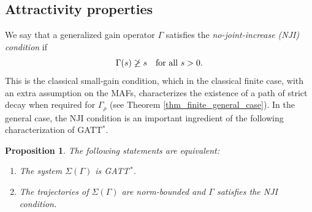 \documentclass[10pt, oneside, a4paper]{article}
\newtheorem{proposition}{Proposition}[section]
\begin{document}
\subsection{Attractivity properties}\label{subsec_stability}

We say that a generalized gain operator $\Gamma$ satisfies the \emph{no-joint-increase (NJI) condition} if%
\begin{equation*}
  \Gamma(s) \not\geq s \mbox{\quad for all\ } s > 0.%
\end{equation*}
This is the classical small-gain condition, which in the classical finite case, with an extra assumption on the MAFs, characterizes the existence of a path of strict decay when required for $\Gamma_{\rho}$ (see Theorem \ref{thm_finite_general_case}). In the general case, the NJI condition is an important ingredient of the following characterization of GATT$^*$.%

\begin{proposition}\label{prop_GATT_star_char}
The following statements are equivalent:%
\begin{enumerate}
\item[(a)] The system $\Sigma(\Gamma)$ is GATT$^{\,*}$.%
\item[(b)] The trajectories of $\Sigma(\Gamma)$ are norm-bounded and $\Gamma$ satisfies the NJI condition.%
\end{enumerate}
\end{proposition}
\end{document}
